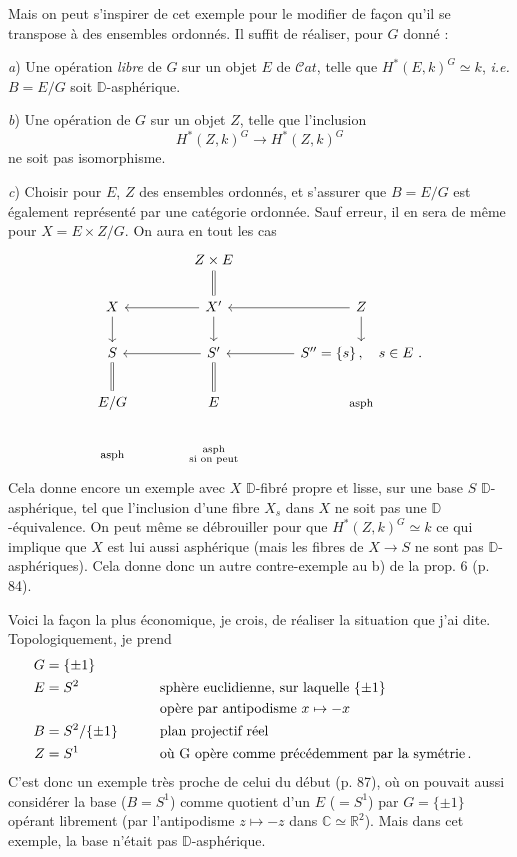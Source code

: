 \documentclass[11pt,leqno]{article}
\newcommand{\printedpage}[1]{\marginpar{\footnotesize p.~#1}}
\newcommand{\msp}[1]{\marginpar{\footnotesize [#1]}}
\newcommand{\D}{\mathbb{D}}
\newcommand{\Cat}{\mathcal{C}at}
\newcommand{\RR}{\mathbb{R}}
\begin{document}
\printedpage{57}

\msp{page 93}
Mais on peut s'inspirer de cet exemple pour le modifier de façon qu'il se transpose à des ensembles ordonnés. Il suffit de réaliser, pour $G$ donné :

\textit{a}) Une opération \textit{libre} de $G$ sur un objet $E$ de $\Cat$, telle que $H^*(E,k)^G \simeq k$, \textit{i.e.} $B = E/G$ soit $\D$-asphérique.

\textit{b}) Une opération de $G$ sur un objet $Z$, telle que l'inclusion
\[ H^*(Z,k)^G \longrightarrow H^*(Z,k)^G \] %
ne soit pas isomorphisme.

\textit{c}) Choisir pour $E$, $Z$ des ensembles ordonnés, et s'assurer que $B = E/G$ est également représenté par une catégorie ordonnée. Sauf erreur, il en sera de même pour $X = E \times Z/G$. On aura en tout les cas %
\[
\begin{tikzcd}[column sep=large]
 & Z \times E \arrow[d, equal] & \\
X \arrow[d] & X' \arrow[l] \arrow[d] & Z \arrow[l] \arrow[d] \\
S \arrow[d, equal] & S' \arrow[l] \arrow[d, equal] & S'' = \{s\}\, , \quad s \in E \ . \arrow[l] \\
E/G & E & \text{\footnotesize asph} \\
\text{\footnotesize asph} & \substack{\text{asph} \\ \text{si on peut}} &
\end{tikzcd}
\]
Cela donne encore un exemple avec $X$ $\D$-fibré propre et lisse, sur une base $S$ $\D$-asphérique, tel que l'inclusion d'une fibre $X_s$ dans $X$ ne soit pas une $\D$-équivalence. On peut même se débrouiller pour que $H^*(Z,k)^G \simeq k$ ce qui implique
\msp{page 94}
que $X$ est lui aussi asphérique (mais les fibres de $X \to S$ ne sont pas $\D$-asphériques). Cela donne donc un autre contre-exemple au b) de la prop. 6 (p. 84).

Voici la façon la plus économique, je crois, de réaliser la situation que j'ai dite. Topologiquement, je prend %
\[
\begin{aligned}
G &= \{\pm 1\} \\
E &= S^2 &\qquad& \text{sphère euclidienne, sur laquelle } \{\pm 1\} \\
  &      &&      \text{opère par antipodisme } x \mapsto -x \\
B &= S^2/\{\pm 1\} && \text{plan projectif réel} \\
Z &= S^1 && \text{où G opère comme précédemment par la symétrie\,.}
\end{aligned}
\]
C'est donc un exemple très proche de celui du début (p. 87), où on pouvait aussi considérer la base ($B = S^1$) comme quotient d'un $E$ ($= S^1$) par $G = \{\pm 1\}$ opérant librement (par
\printedpage{58}
l'antipodisme $z \mapsto -z$ dans $\mathbb{C} \simeq \RR^2$). Mais dans cet exemple, la base n'était pas $\D$-asphérique.
\end{document}
